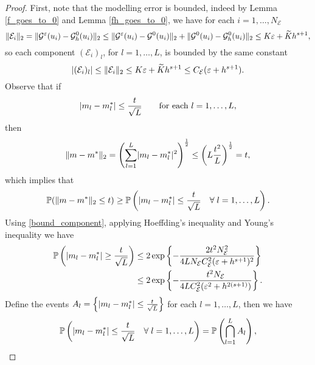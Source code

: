 \begin{proof}
First, note that the modelling error is bounded, indeed by Lemma \ref{f_goes_to_0} and Lemma \ref{fh_goes_to_0}, we have for each $i = 1, \dots, N_{\mathcal{E}}$
\begin{equation*}
\lVert\mathcal{E}_i\rVert_2 = \lVert\mathcal{G}^{\varepsilon}(u_i) - \mathcal{G}^0_h(u_i)\rVert_2 \le \lVert\mathcal{G}^{\varepsilon}(u_i) - \mathcal{G}^0(u_i)\rVert_2 + \lVert\mathcal{G}^0(u_i) - \mathcal{G}^0_h(u_i)\rVert_2 \le K \varepsilon + \widetilde{K} h^{s+1},
\end{equation*}
so each component $(\mathcal{E}_i)_l$, for $l = 1, \dots, L$, is bounded by the same constant
\begin{equation}
\label{bound_component}
\lvert(\mathcal{E}_i)_l\rvert \le \lVert\mathcal{E}_i\rVert_2 \le K \varepsilon + \widetilde{K} h^{s+1} \le C_{\mathcal{E}} ( \varepsilon + h^{s+1} ).
\end{equation}
Observe that if
\[ \lvert m_l - m^*_l\rvert \le \frac{t}{\sqrt{L}} \qquad \text{for each } l = 1, \dots, L, \]
then
\begin{equation*}
\lVert m - m^*\rVert_2 = \left ( \sum_{l=1}^L \lvert m_l - m^*_l\rvert^2 \right )^{\frac{1}{2}} \le \left ( L \frac{t^2}{L} \right )^{\frac{1}{2}} = t,
\end{equation*}
which implies that
\begin{equation}
\label{1toL}
\mathbb{P}( \lVert m - m^*\rVert_2 \le t ) \ge \mathbb{P} \left ( \lvert m_l - m^*_l\rvert \le \frac{t}{\sqrt{L}} \quad \forall \; l = 1, \dots, L \right ).
\end{equation}
Using \eqref{bound_component}, applying Hoeffding's inequality and Young's inequality we have
\begin{equation}
\begin{aligned}
\label{hoeffding}
\mathbb{P} \left ( \lvert m_l - m^*_l\rvert \ge \frac{t}{\sqrt{L}} \right ) &\le 2 \exp \left \{ - \frac{2 t^2 N_{\mathcal{E}}^2}{4 L N_{\mathcal{E}} C_{\mathcal{E}}^2 (\varepsilon + h^{s+1})^2 } \right \} \\
&\le 2 \exp \left \{ - \frac{t^2 N_{\mathcal{E}}}{4 L C_{\mathcal{E}}^2 (\varepsilon^2 + h^{2(s+1)})} \right \}.
\end{aligned}
\end{equation}
Define the events $A_l = \left \{ \lvert m_l - m^*_l\rvert \le \frac{t}{\sqrt{L}} \right \}$ for each $l = 1, \dots, L$, then we have
\begin{equation*}
\mathbb{P} \left ( \abs{m_l - m^*_l} \le \frac{t}{\sqrt{L}} \quad \forall \; l = 1, \dots, L \right ) = \mathbb{P} \left ( \bigcap_{l=1}^L A_l \right ),

\end{equation*}
\end{proof}

